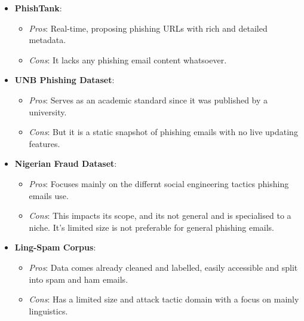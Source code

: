 \begin{itemize}
\begin{itemize}
  \end{itemize}
  \item \textbf{PhishTank}:
  \begin{itemize}
    \item \textit{Pros}: Real-time, proposing phishing URLs with rich and detailed metadata.
    \item \textit{Cons}: It lacks any phishing email content whatsoever.
  \end{itemize}
  \item \textbf{UNB Phishing Dataset}:
  \begin{itemize}
    \item \textit{Pros}: Serves as an academic standard since it was published by a university.
    \item \textit{Cons}: But it is a static snapshot of phishing emails with no live updating features.
  \end{itemize}
  \item \textbf{Nigerian Fraud Dataset}:
  \begin{itemize}
    \item \textit{Pros}: Focuses mainly on the differnt social engineering tactics phishing emails use.
    \item \textit{Cons}: This impacts its scope, and its not general and is specialised to a niche. It's limited size is not preferable for general phishing emails.
  \end{itemize}
  \item \textbf{Ling-Spam Corpus}:
  \begin{itemize}
    \item \textit{Pros}: Data comes already cleaned and labelled, easily accessible and split into spam and ham emails.
    \item \textit{Cons}: Has a limited size and attack tactic domain with a focus on mainly linguistics.
  \end{itemize}
\end{itemize}
